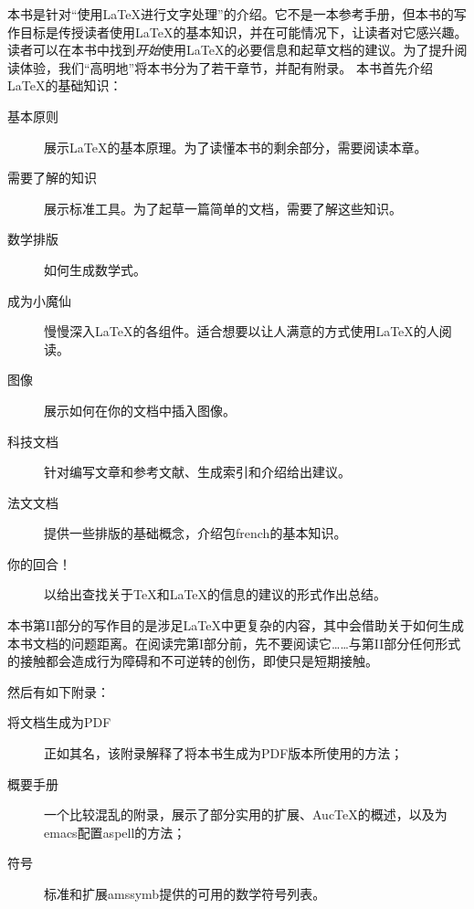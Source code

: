 本书是针对“使用\LaTeX 进行文字处理”的介绍。它不是一本参考手册，但本书的写作目标是传授读者使用\LaTeX 的基本知识，并在可能情况下，让读者对它感兴趣。读者可以在本书中找到\emph{开始}使用\LaTeX 的必要信息和起草文档的建议。为了提升阅读体验，我们“高明地”将本书分为了若干章节，并配有附录。
本书首先介绍\LaTeX 的基础知识：
\begin{description}

\item[基本原则]展示\LaTeX 的基本原理。为了读懂本书的剩余部分，需要阅读本章。

\item[需要了解的知识]展示标准工具。为了起草一篇简单的文档，需要了解这些知识。

\item[数学排版]如何生成数学式。

\item[成为小魔仙]慢慢深入\LaTeX 的各组件。适合想要以让人满意的方式使用\LaTeX 的人阅读。

\item[图像]展示如何在你的文档中插入图像。

\item[科技文档]针对编写文章和参考文献、生成索引和介绍给出建议。

\item[法文文档] 提供一些排版的基础概念，介绍包\textsf{french}的基本知识。

\item[你的回合！] 以给出查找关于\TeX 和\LaTeX 的信息的建议的形式作出总结。
\end{description}

\begin{exclamation}
本书第II部分的写作目的是涉足\LaTeX 中更复杂的内容，其中会借助关于如何生成本书文档的问题距离。在阅读完第I部分前，先不要阅读它……与第II部分任何形式的接触都会造成行为障碍和不可逆转的创伤，即使只是短期接触。
\end{exclamation}

然后有如下附录：

\begin{description}
    \item[将文档生成为PDF] 正如其名，该附录解释了将本书生成为PDF版本所使用的方法；
    \item[概要手册] 一个比较混乱的附录，展示了部分实用的扩展、Auc\TeX 的概述，以及为\textsf{emacs}配置\textsf{aspell}的方法；
    \item[符号] 标准和扩展\textsf{amssymb}提供的可用的数学符号列表。
\end{description}

